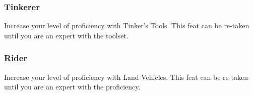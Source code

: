 \subsubsection{Tinkerer} \label{feat::tinkerer}
    Increase your level of proficiency with Tinker's Tools.
    This feat can be re-taken until you are an expert with the toolset.

\subsubsection{Rider} \label{feat::rider}
    Increase your level of proficiency with Land Vehicles.
    This feat can be re-taken until you are an expert with the proficiency.

